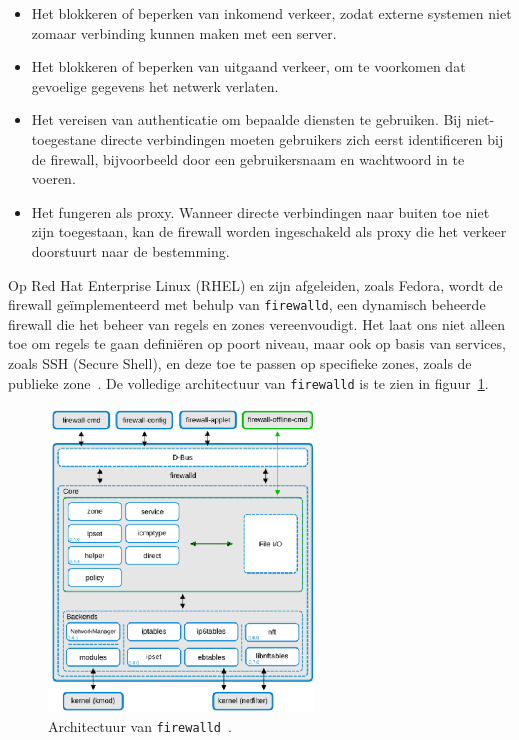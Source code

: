 \begin{itemize}
    \item Het blokkeren of beperken van inkomend verkeer, zodat externe systemen niet zomaar verbinding kunnen maken met een server.
    \item Het blokkeren of beperken van uitgaand verkeer, om te voorkomen dat gevoelige gegevens het netwerk verlaten.
    \item Het vereisen van authenticatie om bepaalde diensten te gebruiken. Bij niet-toegestane directe verbindingen moeten gebruikers zich eerst identificeren bij de firewall, bijvoorbeeld door een gebruikersnaam en wachtwoord in te voeren.
    \item Het fungeren als proxy. Wanneer directe verbindingen naar buiten toe niet zijn toegestaan, kan de firewall worden ingeschakeld als proxy die het verkeer doorstuurt naar de bestemming.
\end{itemize}

Op Red Hat Enterprise Linux (RHEL) en zijn afgeleiden, zoals Fedora, wordt de firewall ge\"implementeerd met behulp van \texttt{firewalld}, een dynamisch beheerde firewall die het beheer van regels en zones vereenvoudigt.
Het laat ons niet alleen toe om regels te gaan defini\"eren op poort niveau, maar ook op basis van services, zoals SSH (Secure Shell), en deze toe te passen op specifieke zones, zoals de publieke zone~\autocite{dakic2022linux}.
De volledige architectuur van \texttt{firewalld} is te zien in figuur~\ref{fig:firewalld-architecture}.

\begin{figure}[h!]
    \begin{center}
        \includegraphics[width=200pt]
        {./graphics/linux/firewalld-architecture.png}
        \caption[Architectuur van firewalld.]{\label{fig:firewalld-architecture}Architectuur van \texttt{firewalld}~\autocite{dakic2022linux}.}
    \end{center}
\end{figure}

